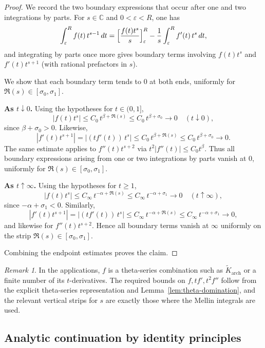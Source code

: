 \documentclass[11pt]{amsart}
\theoremstyle{definition}
\theoremstyle{remark}
\newtheorem{remark}[theorem]{Remark}
\newcommand{\C}{\mathbb{C}}
\begin{document}
\begin{proof}
We record the two boundary expressions that occur after one and two integrations by parts.
For $s\in\C$ and $0<\varepsilon<R$, one has
\begin{equation}\label{eq:ibp1}
\int_{\varepsilon}^{R} f(t)\,t^{s-1}\,dt
=
\Bigl[\frac{f(t)t^{s}}{s}\Bigr]_{\varepsilon}^{R}
-\frac{1}{s}\int_{\varepsilon}^{R} f'(t)\,t^{s}\,dt,
\end{equation}
and integrating by parts once more gives boundary terms involving
$f(t)t^{s}$ and $f'(t)t^{s+1}$ (with rational prefactors in $s$).

We show that each boundary term tends to $0$ at both ends, uniformly for
$\Re(s)\in[\sigma_0,\sigma_1]$.

\smallskip
\noindent\textbf{As $t\downarrow0$.}
Using the hypotheses for $t\in(0,1]$,
\[
|f(t)t^{s}|\le C_0\, t^{\beta+\Re(s)}\le C_0\, t^{\beta+\sigma_0}\to0
\quad (t\downarrow0),
\]
since $\beta+\sigma_0>0$. Likewise,
\[
|f'(t)t^{s+1}| = |(t f'(t))\,t^{s}|
\le C_0\, t^{\beta+\Re(s)}\le C_0\, t^{\beta+\sigma_0}\to0.
\]
The same estimate applies to $f''(t)t^{s+2}$ via $t^2|f''(t)|\le C_0 t^\beta$.
Thus all boundary expressions arising from one or two integrations by parts vanish at $0$,
uniformly for $\Re(s)\in[\sigma_0,\sigma_1]$.

\smallskip
\noindent\textbf{As $t\uparrow\infty$.}
Using the hypotheses for $t\ge1$,
\[
|f(t)t^{s}|\le C_\infty\, t^{-\alpha+\Re(s)}\le C_\infty\, t^{-\alpha+\sigma_1}\to0
\quad (t\uparrow\infty),
\]
since $-\alpha+\sigma_1<0$. Similarly,
\[
|f'(t)t^{s+1}|=|(t f'(t))\,t^{s}|
\le C_\infty\, t^{-\alpha+\Re(s)}\le C_\infty\, t^{-\alpha+\sigma_1}\to0,
\]
and likewise for $f''(t)t^{s+2}$. Hence all boundary terms vanish at $\infty$ uniformly on the
strip $\Re(s)\in[\sigma_0,\sigma_1]$.

Combining the endpoint estimates proves the claim.
\end{proof}

\begin{remark}
In the applications, $f$ is a theta-series combination such as $\widetilde K_{\mathrm{arch}}$ or a
finite number of its $t$-derivatives. The required bounds on $f,t f',t^2 f''$ follow from the
explicit theta-series representation and Lemma~\ref{lem:theta-domination}, and the relevant
vertical strips for $s$ are exactly those where the Mellin integrals are used.
\end{remark}


\subsection{Analytic continuation by identity principles}
\label{app:identity}
\end{document}
